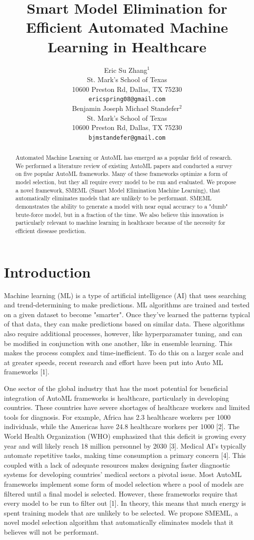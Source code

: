 \documentclass{article}
\title{Smart Model Elimination for Efficient Automated Machine Learning in Healthcare}
\author{%
  Eric Su Zhang$^1$ \\
  St. Mark's School of Texas\\
  10600 Preston Rd, Dallas, TX 75230\\
  \texttt{ericspring08@gmail.com} \\
  \And
  Benjamin Joseph Michael Standefer$^2$ \\
  St. Mark's School of Texas \\
  10600 Preston Rd, Dallas, TX 75230 \\
  \texttt{bjmstandefer@gmail.com} \\
}
\begin{document}
\maketitle


\begin{abstract}
  Automated Machine Learning or AutoML has emerged as a popular field of research. We performed a literature review of existing AutoML papers and conducted a survey on five popular AutoML frameworks. Many of these frameworks optimize a form of model selection, but they all require every model to be run and evaluated. We propose a novel framework, SMEML (Smart Model Elimination Machine Learning), that automatically eliminates models that are unlikely to be performant. SMEML demonstrates the ability to generate a model with near equal accuracy to a "dumb" brute-force model, but in a fraction of the time. We also believe this innovation is particularly relevant to machine learning in healthcare because of the necessity for efficient diesease prediction. 
\end{abstract}


\section{Introduction}

Machine learning (ML) is a type of artificial intelligence (AI) that uses searching and trend-determining to make predictions. ML algorithms are trained and tested on a given dataset to become "smarter". Once they've learned the patterns typical of that data, they can make predictions based on similar data. These algorithms also require additional processes, however, like hyperparamater tuning, and can be modified in conjunction with one another, like in ensemble learning. This makes the process complex and time-inefficient. To do this on a larger scale and at greater speeds, recent research and effort have been put into Auto ML frameworks [1].

One sector of the global industry that has the most potential for beneficial integration of AutoML frameworks is healthcare, particularly in developing countries. These countries have severe shortages of healthcare workers and limited tools for diagnosis. For example, Africa has 2.3 healthcare workers per 1000 individuals, while the Americas have 24.8 healthcare workers per 1000 [2]. The World Health Organization (WHO) emphasized that this deficit is growing every year and will likely reach 18 million personnel by 2030 [3]. Medical AI's typically automate repetitive tasks, making time consumption a primary concern [4]. This coupled with a lack of adequate resources makes designing faster diagnostic systems for developing countries' medical sectors a pivotal issue. 
%
Most AutoML frameworks implement some form of model selection where a pool of models are filtered until a final model is selected. However, these frameworks require that every model to be run to filter out [1]. In theory, this means that much energy is spent training models that are unlikely to be selected. We propose SMEML, a novel model selection algorithm that automatically eliminates models that it believes will not be performant. 
\end{document}
